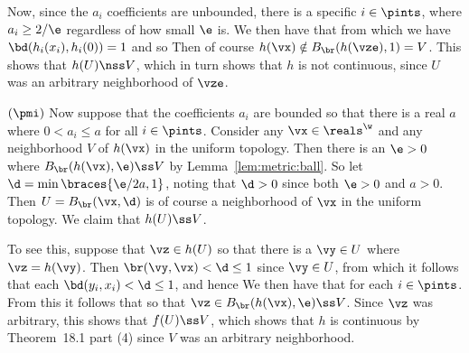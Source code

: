 {{    Now, since the $a_i$ coefficients are unbounded, there is a specific $i \in \pints$, where $a_i \geq 2/\e$ regardless of how small $\e$ is.
    We then have that
    from which we have $\bd(h_i(x_i), h_i(0)) = 1$ and so
    Then of course $h(\vx) \notin B_{\br}(h(\vze), 1) = V$.
    This shows that $h(U) \nss V$, which in turn shows that $h$ is not continuous, since $U$ was an arbitrary neighborhood of $\vze$.

    $(\pmi)$ Now suppose that the coefficients $a_i$ are bounded so that there is a real $a$ where $0 < a_i \leq a$ for all $i \in \pints$.
    Consider any $\vx \in \reals^\w$ and any neighborhood $V$ of $h(\vx)$ in the uniform topology.
    Then there is an $\e > 0$ where $B_{\br}(h(\vx), \e) \ss V$ by Lemma~\ref{lem:metric:ball}.
    So let $\d = \min\braces{\e/2a, 1}$, noting that $\d > 0$ since both $\e > 0$ and $a > 0$.
    Then $U = B_{\br}(\vx, \d)$ is of course a neighborhood of $\vx$ in the uniform topology.
    We claim that $h(U) \ss V$.

    To see this, suppose that $\vz \in h(U)$ so that there is a $\vy \in U$ where $\vz = h(\vy)$.
    Then $\br(\vy, \vx) < \d \leq 1$ since $\vy \in U$, from which it follows that each $\bd(y_i, x_i) < \d \leq 1$, and hence
    We then have that
    for each $i \in \pints$.
    From this it follows that
    so that $\vz \in B_{\br}(h(\vx), \e) \ss V$.
    Since $\vz$ was arbitrary, this shows that $f(U) \ss V$, which shows that $h$ is continuous by Theorem~18.1 part (4) since $V$ was an arbitrary neighborhood.
  }

}
